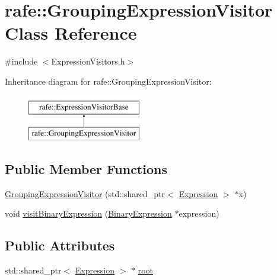 \hypertarget{classrafe_1_1_grouping_expression_visitor}{\section{rafe\+:\+:Grouping\+Expression\+Visitor Class Reference}
\label{classrafe_1_1_grouping_expression_visitor}
}


{\ttfamily \#include $<$Expression\+Visitors.\+h$>$}

Inheritance diagram for rafe\+:\+:Grouping\+Expression\+Visitor\+:\begin{figure}[H]
\begin{center}
\leavevmode
\includegraphics[height=2.000000cm]{classrafe_1_1_grouping_expression_visitor}
\end{center}
\end{figure}
\subsection*{Public Member Functions}
\begin{DoxyCompactItemize}
\item 
\hyperlink{classrafe_1_1_grouping_expression_visitor_ae171337286854c9bd3c3c5eb73c465c7}{Grouping\+Expression\+Visitor} (std\+::shared\+\_\+ptr$<$ \hyperlink{classrafe_1_1_expression}{Expression} $>$ $\ast$x)
\item 
void \hyperlink{classrafe_1_1_grouping_expression_visitor_a5ef6febb7f733f4adcf61bc83a6d10f8}{visit\+Binary\+Expression} (\hyperlink{classrafe_1_1_binary_expression}{Binary\+Expression} $\ast$expression)
\end{DoxyCompactItemize}
\subsection*{Public Attributes}
\begin{DoxyCompactItemize}
\item 
std\+::shared\+\_\+ptr$<$ \hyperlink{classrafe_1_1_expression}{Expression} $>$ $\ast$ \hyperlink{classrafe_1_1_grouping_expression_visitor_a95a43ca2fdb2670f5407d7b38fff1e9e}{root}
\end{DoxyCompactItemize}


